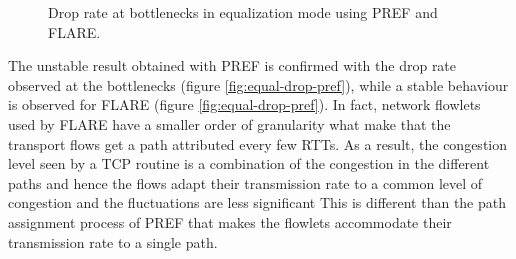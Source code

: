 \begin{figure}[ht]
\centering
{}
\label{fig:dropComparison}
\caption{Drop rate at bottlenecks in equalization mode using  PREF and  FLARE.}
\end{figure}


The unstable result obtained with PREF is confirmed with the drop rate observed at the bottlenecks  (figure \ref{fig:equal-drop-pref}), while a stable behaviour is observed for FLARE (figure \ref{fig:equal-drop-pref}). In fact,   network flowlets used by FLARE have a smaller order of granularity what make that the transport flows get a path attributed every few RTTs. As a result, the congestion level seen by a TCP routine is a combination of the congestion in the different paths and hence the flows adapt their transmission rate to a common level of congestion and the fluctuations are less significant  This is different than the path assignment process of PREF that makes the flowlets accommodate their  transmission rate to a single path.

